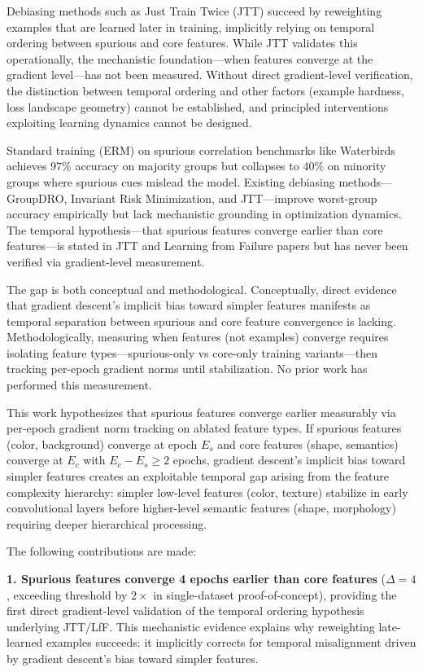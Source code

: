 
Debiasing methods such as Just Train Twice (JTT) succeed by reweighting examples that are learned later in training, implicitly relying on temporal ordering between spurious and core features. While JTT validates this operationally, the mechanistic foundation---when features converge at the gradient level---has not been measured. Without direct gradient-level verification, the distinction between temporal ordering and other factors (example hardness, loss landscape geometry) cannot be established, and principled interventions exploiting learning dynamics cannot be designed.

Standard training (ERM) on spurious correlation benchmarks like Waterbirds achieves 97\% accuracy on majority groups but collapses to 40\% on minority groups where spurious cues mislead the model. Existing debiasing methods---GroupDRO, Invariant Risk Minimization, and JTT---improve worst-group accuracy empirically but lack mechanistic grounding in optimization dynamics. The temporal hypothesis---that spurious features converge earlier than core features---is stated in JTT and Learning from Failure papers but has never been verified via gradient-level measurement.

The gap is both conceptual and methodological. Conceptually, direct evidence that gradient descent's implicit bias toward simpler features manifests as temporal separation between spurious and core feature convergence is lacking. Methodologically, measuring when features (not examples) converge requires isolating feature types---spurious-only vs core-only training variants---then tracking per-epoch gradient norms until stabilization. No prior work has performed this measurement.

This work hypothesizes that spurious features converge earlier measurably via per-epoch gradient norm tracking on ablated feature types. If spurious features (color, background) converge at epoch $E_s$ and core features (shape, semantics) converge at $E_c$ with $E_c - E_s \geq 2$ epochs, gradient descent's implicit bias toward simpler features creates an exploitable temporal gap arising from the feature complexity hierarchy: simpler low-level features (color, texture) stabilize in early convolutional layers before higher-level semantic features (shape, morphology) requiring deeper hierarchical processing.

The following contributions are made:

\textbf{1. Spurious features converge 4 epochs earlier than core features} ($\Delta=4$, exceeding threshold by $2\times$ in single-dataset proof-of-concept), providing the first direct gradient-level validation of the temporal ordering hypothesis underlying JTT/LfF. This mechanistic evidence explains why reweighting late-learned examples succeeds: it implicitly corrects for temporal misalignment driven by gradient descent's bias toward simpler features.


